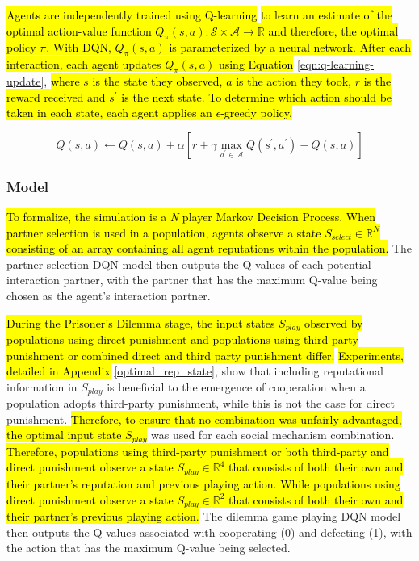 \documentclass[sn-aps,numbered]{sn-jnl}%
\theoremstyle{thmstyleone}%
\theoremstyle{thmstyletwo}%
\theoremstyle{thmstylethree}%
\begin{document}
\hl{Agents are independently trained using Q-learning} \citep{watkins1992q} \hl{to learn an estimate of the optimal action-value function $Q_\pi(s,a): \mathcal{S} \times \mathcal{A} \rightarrow \mathbb{R}$ and therefore, the optimal policy $\pi$. With DQN, $Q_\pi(s,a)$ is parameterized by a neural network. After each interaction, each agent updates $Q_\pi(s,a)$ using Equation} \ref{eqn:q-learning-update}, \hl{where $s$ is the state they observed, $a$ is the action they took, $r$ is the reward received and $s^{\prime}$ is the next state. To determine which action should be taken in each state, each agent applies an $\epsilon$-greedy policy.} 

\begin{equation}
    Q(s, a) \leftarrow Q(s, a) + \alpha \left[r +\gamma \max _{a^{\prime} \in \mathcal{A}} Q\left(s^{\prime}, a^{\prime}\right) -Q(s, a)\right]
    \label{eqn:q-learning-update}
\end{equation}

\subsubsection{Model}

\hl{To formalize, the simulation is a \textit{N} player Markov Decision Process. When partner selection is used in a population, agents observe a state $S_{select} \in \mathbb{R}^{N}$ consisting of an array containing all agent reputations within the population.} The partner selection DQN model then outputs the Q-values of each potential interaction partner, with the partner that has the maximum Q-value being chosen as the agent's interaction partner. 

\hl{During the Prisoner's Dilemma stage, the input states $S_{play}$ observed by populations using direct punishment and populations using third-party punishment or combined direct and third party punishment differ.} \hl{Experiments, detailed in Appendix} \ref{optimal_rep_state}, show that including reputational information in $S_{play}$ is beneficial to the emergence of cooperation when a population adopts third-party punishment, while this is not the case for direct punishment. \hl{Therefore, to ensure that no combination was unfairly advantaged, the optimal input state $S_{play}$} was used for each social mechanism combination. \hl{Therefore, populations using third-party punishment or both third-party and direct punishment observe a state $S_{play} \in \mathbb{R}^{4}$ that consists of both their own and their partner's reputation and previous playing action. While populations using direct punishment observe a state $S_{play} \in \mathbb{R}^{2}$ that consists of both their own and their partner's previous playing action.} The dilemma game playing DQN model then outputs the Q-values associated with cooperating (0) and defecting (1), with the action that has the maximum Q-value being selected. 
\end{document}
